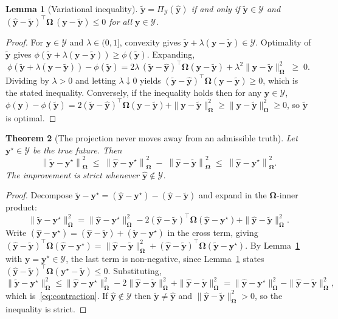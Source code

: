 \documentclass[11pt]{article}
\theoremstyle{plain}
\newtheorem{theorem}{Theorem}
\newtheorem{lemma}[theorem]{Lemma}
\theoremstyle{definition}
\theoremstyle{remark}
\newcommand{\by}{\bm{y}}
\newcommand{\bOm}{\bm{\Omega}}
\newcommand{\yhat}{\hat{\by}}
\newcommand{\ytil}{\tilde{\by}}
\newcommand{\cY}{\mathcal{Y}}
\begin{document}
\begin{lemma}[Variational inequality]
\label{lem:vi}
$\ytil = \Pi_{\cY}(\yhat)$ if and only if $\ytil \in \cY$ and
$(\yhat - \ytil)^{\top}\bOm\,(\by - \ytil) \le 0$ for all $\by \in \cY$.
\end{lemma}
\begin{proof}
For $\by \in \cY$ and $\lambda \in (0,1]$, convexity gives $\ytil + \lambda(\by-\ytil) \in \cY$. Optimality of $\ytil$ gives $\phi(\ytil + \lambda(\by-\ytil)) \ge \phi(\ytil)$. Expanding,
\[
\phi(\ytil+\lambda(\by-\ytil)) - \phi(\ytil)
= 2\lambda\,(\ytil-\yhat)^{\top}\bOm(\by-\ytil) + \lambda^{2}\|\by-\ytil\|_{\bOm}^{2} \;\ge\; 0 .
\]
Dividing by $\lambda>0$ and letting $\lambda \downarrow 0$ yields $(\ytil-\yhat)^{\top}\bOm(\by-\ytil) \ge 0$, which is the stated inequality. Conversely, if the inequality holds then for any $\by \in \cY$,
$\phi(\by) - \phi(\ytil) = 2(\ytil-\yhat)^{\top}\bOm(\by-\ytil) + \|\by-\ytil\|_{\bOm}^{2} \ge \|\by-\ytil\|_{\bOm}^{2} \ge 0$,
so $\ytil$ is optimal.
\end{proof}

\begin{theorem}[The projection never moves away from an admissible truth]
\label{thm:contraction}
Let $\by^{\star} \in \cY$ be the true future. Then
\begin{equation}
\left\| \ytil - \by^{\star} \right\|_{\bOm}^{2}
\;\le\;
\left\| \yhat - \by^{\star} \right\|_{\bOm}^{2}
\;-\;
\left\| \yhat - \ytil \right\|_{\bOm}^{2}
\;\le\;
\left\| \yhat - \by^{\star} \right\|_{\bOm}^{2}.
\label{eq:contraction}
\end{equation}
The improvement is strict whenever $\yhat \notin \cY$.
\end{theorem}
\begin{proof}
Decompose $\ytil - \by^{\star} = (\yhat - \by^{\star}) - (\yhat - \ytil)$ and expand in the $\bOm$-inner product:
\[
\|\ytil-\by^{\star}\|_{\bOm}^{2}
= \|\yhat-\by^{\star}\|_{\bOm}^{2} - 2(\yhat-\ytil)^{\top}\bOm(\yhat-\by^{\star}) + \|\yhat-\ytil\|_{\bOm}^{2}.
\]
Write $(\yhat-\by^{\star}) = (\yhat-\ytil) + (\ytil-\by^{\star})$ in the cross term, giving
$(\yhat-\ytil)^{\top}\bOm(\yhat-\by^{\star}) = \|\yhat-\ytil\|_{\bOm}^{2} + (\yhat-\ytil)^{\top}\bOm(\ytil-\by^{\star})$.
By Lemma~\ref{lem:vi} with $\by = \by^{\star} \in \cY$, the last term is non-negative, since Lemma~\ref{lem:vi} states $(\yhat-\ytil)^{\top}\bOm(\by^{\star}-\ytil) \le 0$. Substituting,
\[
\|\ytil-\by^{\star}\|_{\bOm}^{2}
\le \|\yhat-\by^{\star}\|_{\bOm}^{2} - 2\|\yhat-\ytil\|_{\bOm}^{2} + \|\yhat-\ytil\|_{\bOm}^{2}
= \|\yhat-\by^{\star}\|_{\bOm}^{2} - \|\yhat-\ytil\|_{\bOm}^{2},
\]
which is~\eqref{eq:contraction}. If $\yhat \notin \cY$ then $\ytil \ne \yhat$ and $\|\yhat-\ytil\|_{\bOm}^{2}>0$, so the inequality is strict.
\end{proof}
\end{document}
